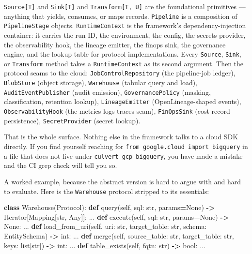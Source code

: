 \documentclass[
  11pt,
  british,
  oneside]{book}
\newenvironment{Shaded}{\begin{snugshade}}{\end{snugshade}}
\newcommand{\BuiltInTok}[1]{#1}
\newcommand{\KeywordTok}[1]{\textcolor[rgb]{0.13,0.29,0.53}{\textbf{#1}}}
\newcommand{\NormalTok}[1]{#1}
\newcommand{\OperatorTok}[1]{\textcolor[rgb]{0.81,0.36,0.00}{\textbf{#1}}}
\newcommand{\VariableTok}[1]{\textcolor[rgb]{0.00,0.00,0.00}{#1}}
\begin{document}
\texttt{Source{[}T{]}} and \texttt{Sink{[}T{]}} and
\texttt{Transform{[}T,\ U{]}} are the foundational primitives ---
anything that yields, consumes, or maps records. \texttt{Pipeline} is a
composition of \texttt{PipelineStage} objects.
\texttt{RuntimeContext} is the framework's
dependency-injection container: it carries the run ID, the environment,
the config, the secrets provider, the observability hook, the lineage
emitter, the finops sink, the governance engine, and the lookup table
for protocol implementations. Every \texttt{Source}, \texttt{Sink}, or
\texttt{Transform} method takes a \texttt{RuntimeContext} as its second
argument. Then the protocol seams to the cloud:
\texttt{JobControlRepository} (the pipeline-job ledger),
\texttt{BlobStore} (object storage), \texttt{Warehouse} (tabular query
and load), \texttt{AuditEventPublisher} (audit emission),
\texttt{GovernancePolicy} (masking, classification, retention lookup),
\texttt{LineageEmitter} (OpenLineage-shaped events),
\texttt{ObservabilityHook} (the metrics-logs-traces seam),
\texttt{FinOpsSink} (cost-record persistence), \texttt{SecretProvider}
(secret lookup).

That is the whole surface. Nothing else in the framework talks to a
cloud SDK directly. If you find yourself reaching for
\texttt{from\ google.cloud\ import\ bigquery} in a file that does not
live under \texttt{culvert-gcp-bigquery}, you have made a mistake and
the CI grep check will tell you so.

A worked example, because the abstract version is hard to argue with and
hard to evaluate. Here is the \texttt{Warehouse} protocol stripped to
its essentials:

\begin{Shaded}
\begin{Highlighting}[]
\KeywordTok{class}\NormalTok{ Warehouse(Protocol):}
    \KeywordTok{def}\NormalTok{ query(}\VariableTok{self}\NormalTok{, sql: }\BuiltInTok{str}\NormalTok{, params}\OperatorTok{=}\VariableTok{None}\NormalTok{) }\OperatorTok{{-}\textgreater{}}\NormalTok{ Iterator[Mapping[}\BuiltInTok{str}\NormalTok{, Any]]: ...}
    \KeywordTok{def}\NormalTok{ execute(}\VariableTok{self}\NormalTok{, sql: }\BuiltInTok{str}\NormalTok{, params}\OperatorTok{=}\VariableTok{None}\NormalTok{) }\OperatorTok{{-}\textgreater{}} \VariableTok{None}\NormalTok{: ...}
    \KeywordTok{def}\NormalTok{ load\_from\_uri(}\VariableTok{self}\NormalTok{, uri: }\BuiltInTok{str}\NormalTok{, target\_table: }\BuiltInTok{str}\NormalTok{,}
\NormalTok{                      schema: EntitySchema) }\OperatorTok{{-}\textgreater{}} \BuiltInTok{int}\NormalTok{: ...}
    \KeywordTok{def}\NormalTok{ merge(}\VariableTok{self}\NormalTok{, source\_table: }\BuiltInTok{str}\NormalTok{, target\_table: }\BuiltInTok{str}\NormalTok{,}
\NormalTok{              keys: }\BuiltInTok{list}\NormalTok{[}\BuiltInTok{str}\NormalTok{]) }\OperatorTok{{-}\textgreater{}} \BuiltInTok{int}\NormalTok{: ...}
    \KeywordTok{def}\NormalTok{ table\_exists(}\VariableTok{self}\NormalTok{, fqtn: }\BuiltInTok{str}\NormalTok{) }\OperatorTok{{-}\textgreater{}} \BuiltInTok{bool}\NormalTok{: ...}
\end{Highlighting}
\end{Shaded}
\end{document}

